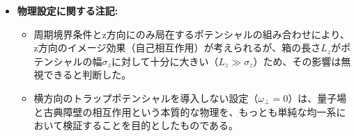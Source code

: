 \documentclass[a4paper,11pt,ja=standard,lualatex]{bxjsarticle}
\begin{document}
\begin{itemize}
    \item \textbf{物理設定に関する注記:} 
    \begin{itemize}
        \item 周期境界条件とz方向にのみ局在するポテンシャルの組み合わせにより、z方向のイメージ効果（自己相互作用）が考えられるが、箱の長さ$L_z$がポテンシャルの幅$\sigma_z$に対して十分に大きい（$L_z \gg \sigma_z$）ため、その影響は無視できると判断した。
        \item 横方向のトラップポテンシャルを導入しない設定（$\omega_{\perp}=0$）は、量子場と古典障壁の相互作用という本質的な物理を、もっとも単純な均一系において検証することを目的としたものである。
    \end{itemize}
\end{itemize}




\end{document}
